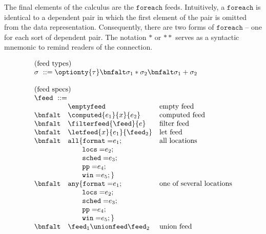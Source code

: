 The final elements of the calculus are the $\mathtt{foreach}$ feeds.
Intuitively, a $\mathtt{foreach}$ is identical to a dependent pair in
which the first element of the pair is omitted from the data representation.
Consequently, there are two forms of $\mathtt{foreach}$ -- one for
each sort of dependent pair.  The notation ${*}$ or ${**}$ serves as
a syntactic mnemonic to remind readers of the connection.

\begin{figure}[t]
\[
\begin{array}{lll}
\multicolumn{3}{l}{\mbox{(feed types)}}\\ 
\multicolumn{3}{l}{\sigma \ ::= \optionty{\tau} 
  \bnfalt \sigma_1 * \sigma_2
  \bnfalt \sigma_1 + \sigma_2}   \\  
\\
\multicolumn{3}{l}{\mbox{(feed specs)}}\\ 
\multicolumn{3}{l}{\feed \ ::=}   \\  
& \emptyfeed & \mbox{empty feed} \\
 \bnfalt & \computed{e_1}{x}{e_2} & \mbox{computed feed} \\
 \bnfalt & \filterfeed{\feed}{e} & \mbox{filter feed} \\
 \bnfalt & \letfeed{x}{e_1}{\feed_2} & \mbox{let feed} \\
 \bnfalt &     \mathtt{all \{ format=} e_1; & \mbox{all locations}\\ 
& \qquad     \mathtt{locs=} e_2; & \\
& \qquad     \mathtt{sched=} e_3; & \\
& \qquad     \mathtt{pp=} e_4; & \\
& \qquad     \mathtt{win=} e_5; \}  & \\
 \bnfalt &     \mathtt{any \{ format=} e_1; & \mbox{one of several locations}\\ 
& \qquad     \mathtt{locs=} e_2; & \\
& \qquad     \mathtt{sched=} e_3; & \\
& \qquad     \mathtt{pp=} e_4; & \\
& \qquad     \mathtt{win=} e_5; \}  & \\
 \bnfalt & \feed_1 \unionfeed \feed_2 & \mbox{union feed} \\

\end{array}\]
\end{figure}
